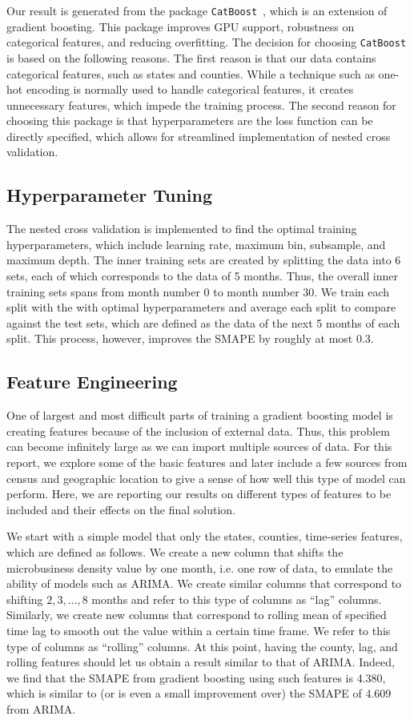 \documentclass[prl,aps,superscriptaddress,twocolumn,10pt,nolongbibliography]{revtex4-2}
\begin{document}
Our result is generated from the package \lstinline{CatBoost}~\cite{prokhorenkova2017catboost,dorogush2018catboost}, which is an extension of gradient boosting. 
This package improves GPU support, robustness on categorical features, and reducing overfitting.
The decision for choosing \lstinline{CatBoost} is based on the following reasons. 
The first reason is that our data contains categorical features, such as states and counties. 
While a technique such as one-hot encoding is normally used to handle categorical features, it creates unnecessary features, which impede the training process.
The second reason for choosing this package is that hyperparameters are the loss function can be directly specified, which allows for streamlined implementation of nested cross validation.

\subsection{Hyperparameter Tuning}
The nested cross validation is implemented to find the optimal training hyperparameters, which include learning rate, maximum bin, subsample, and maximum depth. 
The inner training sets are created by splitting the data into 6 sets, each of which corresponds to the data of 5 months. 
Thus, the overall inner training sets spans from month number 0 to month number 30.
We train each split with the with optimal hyperparameters and average each split to compare against the test sets, which are defined as the data of the next 5 months of each split.
This process, however, improves the SMAPE by roughly at most 0.3.

\subsection{Feature Engineering}
One of largest and most difficult parts of training a gradient boosting model is creating features because of the inclusion of external data.
Thus, this problem can become infinitely large as we can import multiple sources of data. 
For this report, we explore some of the basic features and later include a few sources from census and geographic location to give a sense of how well this type of model can perform.
Here, we are reporting our results on different types of features to be included and their effects on the final solution.

We start with a simple model that only the states, counties, time-series features, which are defined as follows.
We create a new column that shifts the microbusiness density value by one month, i.e. one row of data, to emulate the ability of models such as ARIMA.
We create similar columns that correspond to shifting $2, 3, \ldots, 8$ months and refer to this type of columns as ``lag'' columns.
Similarly, we create new columns that correspond to rolling mean of specified time lag to smooth out the value within a certain time frame.
We refer to this type of columns as ``rolling'' columns.
At this point, having the county, lag, and rolling features should let us obtain a result similar to that of ARIMA. 
Indeed, we find that the SMAPE from gradient boosting using such features is 4.380, which is similar to (or is even a small improvement over) the SMAPE of 4.609 from ARIMA.
\end{document}
